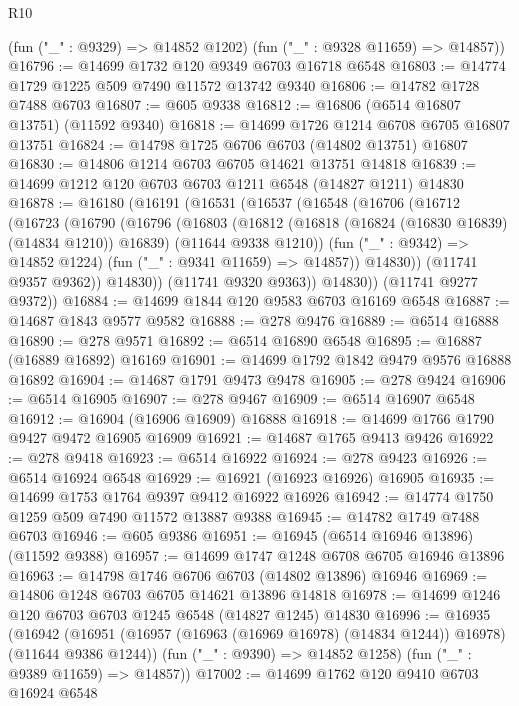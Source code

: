 \begin{lexlean}{R10}
\begin{coremodule}
{{{{{{{{{{{{{{{{{{{{{{{{{{{{{{{{{{{{{{{{{{{{{{{{{{{{{{{{{{{{{{{{{{{{{{{{{{{{{{{{{{{{      (fun ("_" : @9329) => @14852 @1202)
      (fun ("_" : @9328 @11659) => @14857))
@16796 := @14699 @1732 @120 @9349 @6703 @16718 @6548
@16803 := @14774 @1729 @1225 @509 @7490 @11572 @13742 @9340
@16806 := @14782 @1728 @7488 @6703
@16807 := @605 @9338
@16812 := @16806 (@6514 @16807 @13751) (@11592 @9340)
@16818 := @14699 @1726 @1214 @6708 @6705 @16807 @13751
@16824 := @14798 @1725 @6706 @6703 (@14802 @13751) @16807
@16830 := @14806 @1214 @6703 @6705 @14621 @13751 @14818
@16839 := @14699 @1212 @120 @6703 @6703 @1211 @6548 (@14827 @1211) @14830
@16878 := @16180
    (@16191
      (@16531
        (@16537
          (@16548
            (@16706
              (@16712
                (@16723
                  (@16790
                    (@16796
                      (@16803
                        (@16812
                          (@16818 (@16824 (@16830 @16839) (@14834 @1210)) @16839)
                          (@11644 @9338 @1210))
                        (fun ("_" : @9342) => @14852 @1224)
                        (fun ("_" : @9341 @11659) => @14857))
                      @14830))
                  (@11741 @9357 @9362))
                @14830))
            (@11741 @9320 @9363))
          @14830))
      (@11741 @9277 @9372))
@16884 := @14699 @1844 @120 @9583 @6703 @16169 @6548
@16887 := @14687 @1843 @9577 @9582
@16888 := @278 @9476
@16889 := @6514 @16888
@16890 := @278 @9571
@16892 := @6514 @16890 @6548
@16895 := @16887 (@16889 @16892) @16169
@16901 := @14699 @1792 @1842 @9479 @9576 @16888 @16892
@16904 := @14687 @1791 @9473 @9478
@16905 := @278 @9424
@16906 := @6514 @16905
@16907 := @278 @9467
@16909 := @6514 @16907 @6548
@16912 := @16904 (@16906 @16909) @16888
@16918 := @14699 @1766 @1790 @9427 @9472 @16905 @16909
@16921 := @14687 @1765 @9413 @9426
@16922 := @278 @9418
@16923 := @6514 @16922
@16924 := @278 @9423
@16926 := @6514 @16924 @6548
@16929 := @16921 (@16923 @16926) @16905
@16935 := @14699 @1753 @1764 @9397 @9412 @16922 @16926
@16942 := @14774 @1750 @1259 @509 @7490 @11572 @13887 @9388
@16945 := @14782 @1749 @7488 @6703
@16946 := @605 @9386
@16951 := @16945 (@6514 @16946 @13896) (@11592 @9388)
@16957 := @14699 @1747 @1248 @6708 @6705 @16946 @13896
@16963 := @14798 @1746 @6706 @6703 (@14802 @13896) @16946
@16969 := @14806 @1248 @6703 @6705 @14621 @13896 @14818
@16978 := @14699 @1246 @120 @6703 @6703 @1245 @6548 (@14827 @1245) @14830
@16996 := @16935
    (@16942
      (@16951 (@16957 (@16963 (@16969 @16978) (@14834 @1244)) @16978) (@11644 @9386 @1244))
      (fun ("_" : @9390) => @14852 @1258)
      (fun ("_" : @9389 @11659) => @14857))
@17002 := @14699 @1762 @120 @9410 @6703 @16924 @6548
}}}}}}}}}}}}}}}}}}}}}}}}}}}}}}}}}}}}}}}}}}}}}}}}}}}}}}}}}}}}}}}}}}}}}}}}}}}}}}}}}}}}
\end{coremodule}
\end{lexlean}
